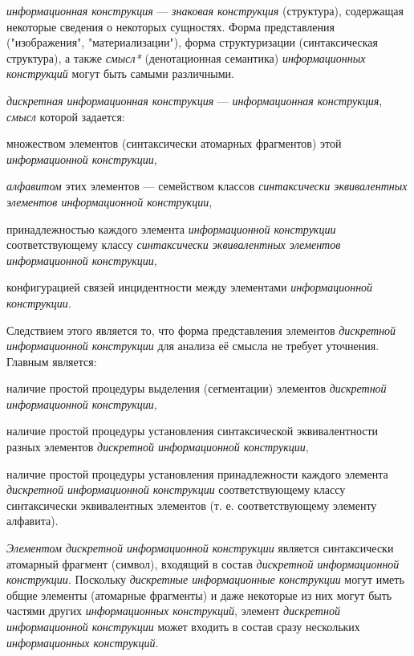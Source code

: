 \textit{информационная конструкция} --- \textit{знаковая конструкция} (структура), содержащая некоторые сведения о некоторых сущностях.
Форма представления ("изображения"{}, "материализации"{}), форма структуризации (синтаксическая структура), а также \textit{смысл*} (денотационная семантика) \textit{\textit{информационных конструкций}} могут быть самыми различными.

\textit{дискретная информационная конструкция} --- \textit{информационная конструкция}, \textit{смысл} которой задается:
\begin{textitemize}
    \item множеством элементов (синтаксически атомарных фрагментов) этой \textit{информационной конструкции},
    \item \textit{алфавитом} этих элементов --- семейством классов \textit{синтаксически эквивалентных элементов информационной конструкции},
    \item принадлежностью каждого элемента \textit{информационной конструкции} соответствующему классу \textit{синтаксически эквивалентных элементов информационной конструкции},
    \item конфигурацией связей инцидентности между элементами \textit{информационной конструкции}.
\end{textitemize}

Следствием этого является то, что форма представления элементов \textit{дискретной информационной конструкции} для анализа её смысла не требует уточнения.
Главным является:
\begin{textitemize}
    \item наличие простой процедуры выделения (сегментации) элементов \textit{\textit{дискретной информационной конструкции}},
    \item наличие простой процедуры установления синтаксической эквивалентности разных элементов \textit{дискретной информационной конструкции},
    \item наличие простой процедуры установления принадлежности каждого элемента \textit{дискретной информационной конструкции} соответствующему классу синтаксически эквивалентных элементов (т. е. соответствующему элементу алфавита).
\end{textitemize}

\textit{Элементом \textit{дискретной информационной конструкции}} является синтаксически атомарный фрагмент (символ), входящий в состав \textit{дискретной информационной конструкции}.
Поскольку \textit{дискретные информационные конструкции} могут иметь общие элементы (атомарные фрагменты) и даже некоторые из них могут быть частями других \textit{информационных конструкций}, элемент \textit{дискретной информационной конструкции} может входить в состав сразу нескольких \textit{информационных конструкций}.

